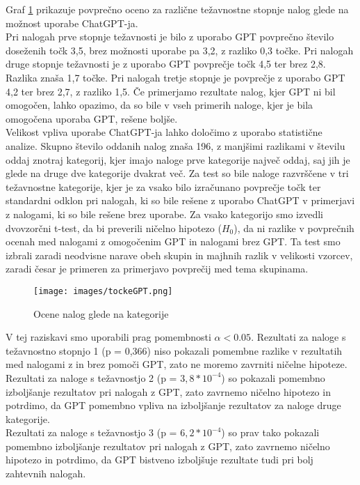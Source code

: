 \documentclass[a4paper,12pt,openright]{book}
\begin{document}
Graf \ref{fig:bar_all} prikazuje povprečno oceno za različne težavnostne stopnje nalog glede na možnost uporabe ChatGPT-ja. \\
Pri nalogah prve stopnje težavnosti je bilo z uporabo GPT povprečno število doseženih točk 3,5, brez možnosti uporabe pa 3,2, z razliko 0,3 točke. Pri nalogah druge stopnje težavnosti je z uporabo GPT povprečje točk 4,5 ter brez 2,8. Razlika znaša 1,7 točke. Pri nalogah tretje stopnje je povprečje z uporabo GPT 4,2 ter brez 2,7, z razliko 1,5. Če primerjamo rezultate nalog, kjer GPT ni bil omogočen, lahko opazimo, da so bile v vseh primerih naloge, kjer je bila omogočena uporaba GPT, rešene boljše. \\
Velikost vpliva uporabe ChatGPT-ja lahko določimo z uporabo statistične analize.
Skupno število oddanih nalog znaša 196, z manjšimi razlikami v številu oddaj znotraj kategorij, kjer imajo naloge prve kategorije največ oddaj, saj jih je glede na druge dve kategorije dvakrat več. Za test so bile naloge razvrščene v tri težavnostne kategorije, kjer je za vsako bilo izračunano povprečje točk ter standardni odklon pri nalogah, ki so bile rešene z uporabo ChatGPT v primerjavi z nalogami, ki so bile rešene brez uporabe. Za vsako kategorijo smo izvedli dvovzorčni t-test, da bi preverili ničelno hipotezo ($H_0$), da ni razlike v povprečnih ocenah med nalogami z omogočenim GPT in nalogami brez GPT. Ta test smo izbrali zaradi neodvisne narave obeh skupin in majhnih razlik v velikosti vzorcev, zaradi česar je primeren za primerjavo povprečij med tema skupinama. 

\begin{figure}[H]
    \centering
    \texttt{[image: images/tockeGPT.png]}
    \caption{Ocene nalog glede na kategorije}
    \label{fig:bar_all}
\end{figure}
V tej raziskavi smo uporabili prag pomembnosti $\alpha < 0.05$.
 Rezultati za naloge s težavnostno stopnjo 1 (p = 0,366) niso pokazali pomembne razlike v rezultatih med nalogami z in brez pomoči GPT, zato ne moremo zavrniti ničelne hipoteze. \\
 Rezultati za naloge s težavnostjo 2 (p = $3,8 * 10^{-4}$) so pokazali pomembno izboljšanje rezultatov pri nalogah z GPT, zato zavrnemo ničelno hipotezo in potrdimo, da GPT pomembno vpliva na izboljšanje rezultatov za naloge druge kategorije. \\
 Rezultati za naloge s težavnostjo 3 (p = $6,2 * 10^{-4}$) so prav tako pokazali pomembno izboljšanje rezultatov pri nalogah z GPT, zato zavrnemo ničelno hipotezo in potrdimo, da GPT bistveno izboljšuje rezultate tudi pri bolj zahtevnih nalogah.\\
\end{document}

